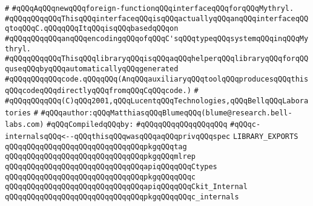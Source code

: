 \label{src/lib/c-glue-lib/internals/c-internals.lib}
\verb|#|\newline
\verb|#qQQqAqQQqnewqQQqforeign-functionqQQqinterfaceqQQqforqQQqMythryl.|\newline
\verb|#qQQqqQQqqQQqThisqQQqinterfaceqQQqisqQQqactuallyqQQqanqQQqinterfaceqQQqtoqQQqC.qQQqqQQqItqQQqisqQQqbasedqQQqon|\newline
\verb|#qQQqqQQqqQQqanqQQqencodingqQQqofqQQqC'sqQQqtypeqQQqsystemqQQqinqQQqMythryl.|\newline
\verb|#qQQqqQQqqQQqThisqQQqlibraryqQQqisqQQqaqQQqhelperqQQqlibraryqQQqforqQQquseqQQqbyqQQqautomaticallyqQQqgenerated|\newline
\verb|#qQQqqQQqqQQqcode.qQQqqQQq(AnqQQqauxiliaryqQQqtoolqQQqproducesqQQqthisqQQqcodeqQQqdirectlyqQQqfromqQQqCqQQqcode.)|\newline
\verb|#|\newline
\verb|#qQQqqQQqqQQq(C)qQQq2001,qQQqLucentqQQqTechnologies,qQQqBellqQQqLaboratories|\newline
\verb|#|\newline
\verb|#qQQqauthor:qQQqMatthiasqQQqBlumeqQQq(blume@research.bell-labs.com)|\newline
\newline
\verb|#qQQqCompiledqQQqby:|\newline
\verb|#qQQqqQQqqQQqqQQqqQQq|\newline
\newline
\verb|#qQQqc-internalsqQQq<--qQQqthisqQQqwasqQQqaqQQqprivqQQqspec|\newline
\newline
\verb|LIBRARY_EXPORTS|\newline
\newline
\verb|qQQqqQQqqQQqqQQqqQQqqQQqqQQqqQQqpkgqQQqtag|\newline
\newline
\verb|qQQqqQQqqQQqqQQqqQQqqQQqqQQqqQQqpkgqQQqmlrep|\newline
\newline
\verb|qQQqqQQqqQQqqQQqqQQqqQQqqQQqqQQqapiqQQqqQQqCtypes|\newline
\verb|qQQqqQQqqQQqqQQqqQQqqQQqqQQqqQQqpkgqQQqqQQqc|\newline
\newline
\verb|qQQqqQQqqQQqqQQqqQQqqQQqqQQqqQQqapiqQQqqQQqCkit_Internal|\newline
\verb|qQQqqQQqqQQqqQQqqQQqqQQqqQQqqQQqpkgqQQqqQQqc_internals|\newline
